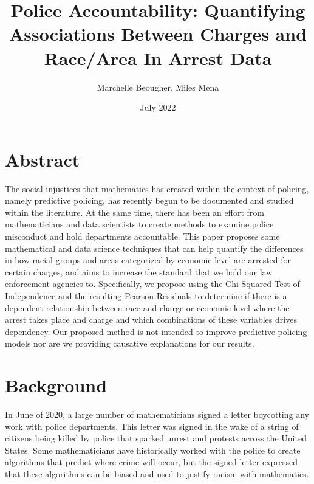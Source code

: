\documentclass{article}
\title{Police Accountability: Quantifying Associations Between Charges and Race/Area In Arrest Data}
\author{Marchelle Beougher, Miles Mena}
\date{July 2022}
\begin{document}
\maketitle

\section{Abstract}



The social injustices that mathematics has created within the context of policing, namely predictive policing, has recently begun to be documented and studied within the literature. At the same time, there has been an effort from mathematicians and data scientists to create methods to examine police misconduct and hold departments accountable. This paper proposes some mathematical and data science techniques that can help quantify the differences in how racial groups and areas categorized by economic level are arrested for certain charges, and aims to increase the standard that we hold our law enforcement agencies to. Specifically, we propose using the Chi Squared Test of Independence and the resulting Pearson Residuals to determine if there is a dependent relationship between race and charge or economic level where the arrest takes place and charge and which combinations of these variables drives dependency. Our proposed method is not intended to improve predictive policing models nor are we providing causative explanations for our results.  




\section{Background}

In June of 2020, a large number of mathematicians signed a letter boycotting any work with police departments. This letter was signed in the wake of a string of citizens being killed by police that sparked unrest and protests across the United States. Some mathematicians have historically worked with the police to create algorithms that predict where crime will occur, but the signed letter expressed that these algorithms can be biased and used to justify racism with mathematics.\cite{website:Letter-AMS} 
\end{document}
